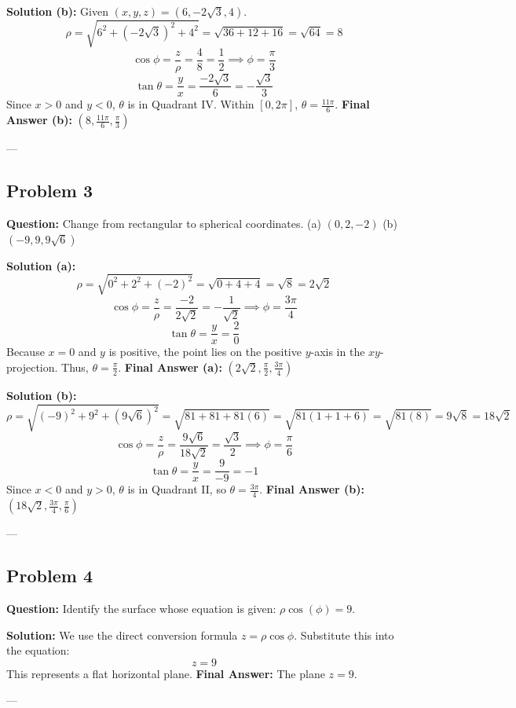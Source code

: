 \documentclass[12pt]{article}
\begin{document}
\textbf{Solution (b):}
Given $(x, y, z) = (6, -2\sqrt{3}, 4)$.
\[ \rho = \sqrt{6^2 + (-2\sqrt{3})^2 + 4^2} = \sqrt{36 + 12 + 16} = \sqrt{64} = 8 \]
\[ \cos\phi = \frac{z}{\rho} = \frac{4}{8} = \frac{1}{2} \implies \phi = \frac{\pi}{3} \]
\[ \tan\theta = \frac{y}{x} = \frac{-2\sqrt{3}}{6} = -\frac{\sqrt{3}}{3} \]
Since $x>0$ and $y<0$, $\theta$ is in Quadrant IV. Within $[0, 2\pi]$, $\theta = \frac{11\pi}{6}$.
\textbf{Final Answer (b):} $\left( 8, \frac{11\pi}{6}, \frac{\pi}{3} \right)$

---

\subsection*{Problem 3}
\textbf{Question:} Change from rectangular to spherical coordinates.
(a) $(0, 2, -2)$
(b) $(-9, 9, 9\sqrt{6})$

\textbf{Solution (a):}
\[ \rho = \sqrt{0^2 + 2^2 + (-2)^2} = \sqrt{0 + 4 + 4} = \sqrt{8} = 2\sqrt{2} \]
\[ \cos\phi = \frac{z}{\rho} = \frac{-2}{2\sqrt{2}} = -\frac{1}{\sqrt{2}} \implies \phi = \frac{3\pi}{4} \]
\[ \tan\theta = \frac{y}{x} = \frac{2}{0} \]
Because $x=0$ and $y$ is positive, the point lies on the positive $y$-axis in the $xy$-projection. Thus, $\theta = \frac{\pi}{2}$.
\textbf{Final Answer (a):} $\left( 2\sqrt{2}, \frac{\pi}{2}, \frac{3\pi}{4} \right)$

\textbf{Solution (b):}
\[ \rho = \sqrt{(-9)^2 + 9^2 + (9\sqrt{6})^2} = \sqrt{81 + 81 + 81(6)} = \sqrt{81(1+1+6)} = \sqrt{81(8)} = 9\sqrt{8} = 18\sqrt{2} \]
\[ \cos\phi = \frac{z}{\rho} = \frac{9\sqrt{6}}{18\sqrt{2}} = \frac{\sqrt{3}}{2} \implies \phi = \frac{\pi}{6} \]
\[ \tan\theta = \frac{y}{x} = \frac{9}{-9} = -1 \]
Since $x<0$ and $y>0$, $\theta$ is in Quadrant II, so $\theta = \frac{3\pi}{4}$.
\textbf{Final Answer (b):} $\left( 18\sqrt{2}, \frac{3\pi}{4}, \frac{\pi}{6} \right)$

---

\subsection*{Problem 4}
\textbf{Question:} Identify the surface whose equation is given: $\rho \cos(\phi) = 9$.

\textbf{Solution:}
We use the direct conversion formula $z = \rho \cos\phi$.
Substitute this into the equation:
\[ z = 9 \]
This represents a flat horizontal plane.
\textbf{Final Answer:} The plane $z = 9$.

---
\end{document}
